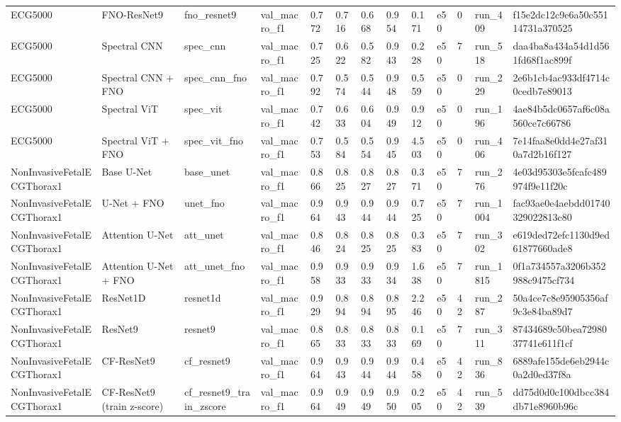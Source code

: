 \begin{longtable}{lllllllllllll}
ECG5000 & FNO-ResNet9 & fno\_resnet9 & val\_macro\_f1 & 0.772 & 0.716 & 0.668 & 0.954 & 0.171 & e50 & 0 & run\_409 & f15e2dc12c9e6a50c55114731a370525 \\
ECG5000 & Spectral CNN & spec\_cnn & val\_macro\_f1 & 0.725 & 0.622 & 0.582 & 0.943 & 0.228 & e50 & 7 & run\_518 & daa4ba8a434a54d1d561fd68f1ac899f \\
ECG5000 & Spectral CNN + FNO & spec\_cnn\_fno & val\_macro\_f1 & 0.792 & 0.574 & 0.544 & 0.948 & 0.559 & e50 & 0 & run\_229 & 2e6b1cb4ac933df4714c0cedb7e89013 \\
ECG5000 & Spectral ViT & spec\_vit & val\_macro\_f1 & 0.742 & 0.633 & 0.604 & 0.949 & 0.912 & e50 & 0 & run\_196 & 4ae84b5dc0657af6c08a560ce7c66786 \\
ECG5000 & Spectral ViT + FNO & spec\_vit\_fno & val\_macro\_f1 & 0.753 & 0.584 & 0.554 & 0.945 & 4.503 & e50 & 0 & run\_406 & 7e14faa8e0dd4e27af310a7d2b16f127 \\
NonInvasiveFetalECGThorax1 & Base U-Net & base\_unet & val\_macro\_f1 & 0.866 & 0.825 & 0.827 & 0.827 & 0.371 & e50 & 7 & run\_276 & 4e03d95303e5fcafc489974f9e11f20c \\
NonInvasiveFetalECGThorax1 & U-Net + FNO & unet\_fno & val\_macro\_f1 & 0.964 & 0.943 & 0.944 & 0.944 & 0.725 & e50 & 7 & run\_1004 & fac93ae0e4aebdd01740329022813c80 \\
NonInvasiveFetalECGThorax1 & Attention U-Net & att\_unet & val\_macro\_f1 & 0.846 & 0.824 & 0.825 & 0.825 & 0.383 & e50 & 7 & run\_302 & e619ded72efc1130d9ed61877660ade8 \\
NonInvasiveFetalECGThorax1 & Attention U-Net + FNO & att\_unet\_fno & val\_macro\_f1 & 0.958 & 0.933 & 0.933 & 0.934 & 1.638 & e50 & 7 & run\_1815 & 0f1a734557a3206b352988c9475cf734 \\
NonInvasiveFetalECGThorax1 & ResNet1D & resnet1d & val\_macro\_f1 & 0.929 & 0.894 & 0.894 & 0.895 & 2.246 & e50 & 42 & run\_287 & 50a4ce7c8e95905356af9c3e84ba89d7 \\
NonInvasiveFetalECGThorax1 & ResNet9 & resnet9 & val\_macro\_f1 & 0.865 & 0.833 & 0.833 & 0.833 & 0.169 & e50 & 7 & run\_311 & 87434689c50bea7298037741e611f1cf \\
NonInvasiveFetalECGThorax1 & CF-ResNet9 & cf\_resnet9 & val\_macro\_f1 & 0.964 & 0.943 & 0.944 & 0.944 & 0.458 & e50 & 42 & run\_836 & 6889afe155de6eb2944c0a2d0ed37f8a \\
NonInvasiveFetalECGThorax1 & CF-ResNet9 (train z-score) & cf\_resnet9\_train\_zscore & val\_macro\_f1 & 0.964 & 0.949 & 0.949 & 0.950 & 0.205 & e50 & 42 & run\_539 & dd75d0d0c100dbcc384db71e8960b96c \\

\end{longtable}
